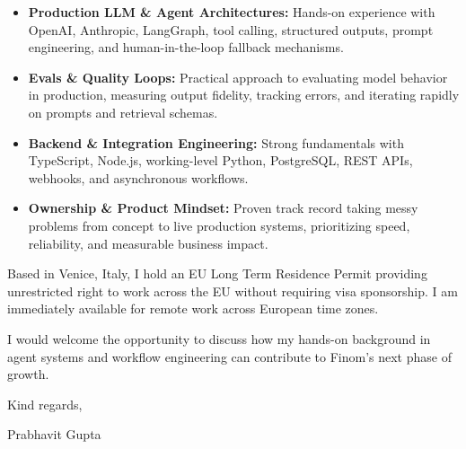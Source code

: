 \documentclass[11pt,a4paper]{article}
\begin{document}
\begin{itemize}[leftmargin=*]
    \item \textbf{Production LLM \& Agent Architectures:} Hands-on experience with OpenAI, Anthropic, LangGraph, tool calling, structured outputs, prompt engineering, and human-in-the-loop fallback mechanisms.
    \item \textbf{Evals \& Quality Loops:} Practical approach to evaluating model behavior in production, measuring output fidelity, tracking errors, and iterating rapidly on prompts and retrieval schemas.
    \item \textbf{Backend \& Integration Engineering:} Strong fundamentals with TypeScript, Node.js, working-level Python, PostgreSQL, REST APIs, webhooks, and asynchronous workflows.
    \item \textbf{Ownership \& Product Mindset:} Proven track record taking messy problems from concept to live production systems, prioritizing speed, reliability, and measurable business impact.
\end{itemize}

\noindent Based in Venice, Italy, I hold an EU Long Term Residence Permit providing unrestricted right to work across the EU without requiring visa sponsorship. I am immediately available for remote work across European time zones.

\noindent I would welcome the opportunity to discuss how my hands-on background in agent systems and workflow engineering can contribute to Finom's next phase of growth.

\vspace{8pt}

\noindent Kind regards,

\vspace{8pt}

\noindent Prabhavit Gupta
\end{document}
